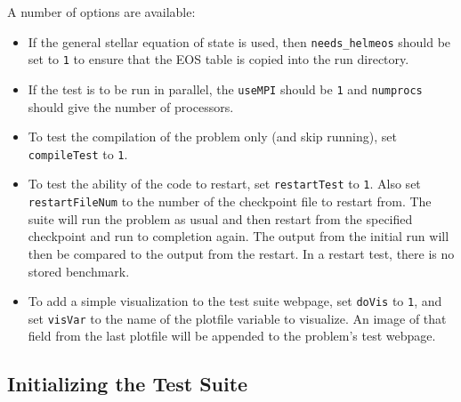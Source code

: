 A number of options are available:
\begin{itemize}
\item  If the general stellar equation of state is
used, then {\tt needs\_helmeos} should be set to {\tt 1} to ensure that the
EOS table is copied into the run directory.  

\item If the test is to be run in parallel,
the {\tt useMPI} should be {\tt 1} and {\tt numprocs} should give the number
of processors.  

\item To test the compilation of the problem only (and skip running),
set {\tt compileTest} to {\tt 1}.  

\item To test the ability of the code to restart, set {\tt restartTest} to
{\tt 1}.  Also set {\tt restartFileNum} to the number of the checkpoint file to restart
from.  The suite will run the problem as usual and then restart from the specified
checkpoint and run to completion again.  The output from the initial run will
then be compared to the output from the restart.  In a restart test, there
is no stored benchmark.

\item To add a simple visualization to the test suite webpage, set
  {\tt doVis} to {\tt 1}, and set {\tt visVar} to the name of the
  plotfile variable to visualize.  An image of that field from the
  last plotfile will be appended to the problem's test webpage.

\end{itemize}



\subsection{Initializing the Test Suite}

